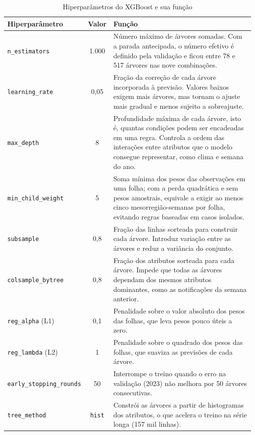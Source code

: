 \begin{table}[htb]
\centering
\caption{Hiperparâmetros do XGBoost e sua função}
\label{tab:hiperparametros}
\small
\begin{tabular}{|p{}|c|p{}|}
\hline
\textbf{Hiperparâmetro} & \textbf{Valor} & \textbf{Função} \\ \hline
\texttt{n\_estimators} & 1.000 & Número máximo de árvores somadas. Com a parada antecipada, o número efetivo é definido pela validação e ficou entre 78 e 517 árvores nas nove combinações. \\ \hline
\texttt{learning\_rate} & 0,05 & Fração da correção de cada árvore incorporada à previsão. Valores baixos exigem mais árvores, mas tornam o ajuste mais gradual e menos sujeito a sobreajuste. \\ \hline
\texttt{max\_depth} & 8 & Profundidade máxima de cada árvore, isto é, quantas condições podem ser encadeadas em uma regra. Controla a ordem das interações entre atributos que o modelo consegue representar, como clima e semana do ano. \\ \hline
\texttt{min\_child\_weight} & 5 & Soma mínima dos pesos das observações em uma folha; com a perda quadrática e sem pesos amostrais, equivale a exigir ao menos cinco mesorregião-semanas por folha, evitando regras baseadas em casos isolados. \\ \hline
\texttt{subsample} & 0,8 & Fração das linhas sorteada para construir cada árvore. Introduz variação entre as árvores e reduz a variância do conjunto. \\ \hline
\texttt{colsample\_bytree} & 0,8 & Fração dos atributos sorteada para cada árvore. Impede que todas as árvores dependam dos mesmos atributos dominantes, como as notificações da semana anterior. \\ \hline
\texttt{reg\_alpha} (L1) & 0,1 & Penalidade sobre o valor absoluto dos pesos das folhas, que leva pesos pouco úteis a zero. \\ \hline
\texttt{reg\_lambda} (L2) & 1 & Penalidade sobre o quadrado dos pesos das folhas, que suaviza as previsões de cada árvore. \\ \hline
\texttt{early\_stopping\_\allowbreak rounds} & 50 & Interrompe o treino quando o erro na validação (2023) não melhora por 50 árvores consecutivas. \\ \hline
\texttt{tree\_method} & \texttt{hist} & Constrói as árvores a partir de histogramas dos atributos, o que acelera o treino na série longa (157 mil linhas). \\ \hline
\end{tabular}
\end{table}

